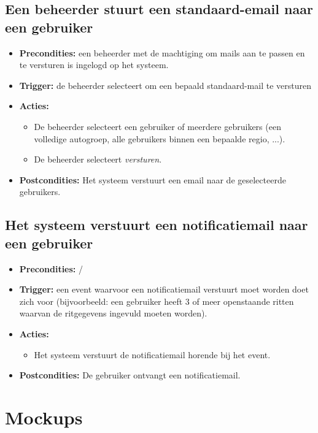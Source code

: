 \documentclass[11pt,a4paper,oneside]{article}
\begin{document}
\subsection{Een beheerder stuurt een standaard-email naar een gebruiker}
\begin{itemize}
\item \textbf{Precondities:} een beheerder met de machtiging om mails aan te passen en te versturen is ingelogd op het systeem.
\item \textbf{Trigger:} de beheerder selecteert om een bepaald standaard-mail te versturen
\item \textbf{Acties:} 
\begin{itemize}
	\item	De beheerder selecteert een gebruiker of meerdere gebruikers (een volledige autogroep, alle gebruikers binnen een bepaalde regio, ...).
	\item	De beheerder selecteert \emph{versturen}.
\end{itemize}
\item \textbf{Postcondities:} Het systeem verstuurt een email naar de geselecteerde gebruikers.
\end{itemize}

\subsection{Het systeem verstuurt een notificatiemail naar een gebruiker}
\begin{itemize}
\item \textbf{Precondities:} /
\item \textbf{Trigger:} een event waarvoor een notificatiemail verstuurt moet worden doet zich voor (bijvoorbeeld: een gebruiker heeft 3 of meer openstaande ritten waarvan de ritgegevens ingevuld moeten worden).
\item \textbf{Acties:} 
\begin{itemize}
	\item	Het systeem verstuurt de notificatiemail horende bij het event.
\end{itemize}
\item \textbf{Postcondities:} De gebruiker ontvangt een notificatiemail.
\end{itemize}

\section{Mockups}
\end{document}
